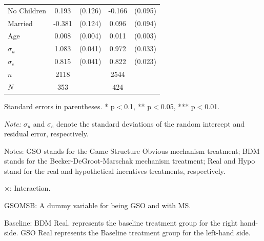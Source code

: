 \documentclass[12pt]{article}
\newcommand{\sym}[1]{\rlap{$^{#1}$}}
\begin{document}
\begin{table}[H]
{\begin{tabular}{l*{2}{cc}}
No Children &       0.193         &     (0.126)&      -0.166\sym{*}  &     (0.095)\\
Married     &      -0.381\sym{***}&     (0.124)&       0.096         &     (0.094)\\
Age         &       0.008\sym{**} &     (0.004)&       0.011\sym{***}&     (0.003)\\
$\sigma_u$     &       1.083\sym{***}&     (0.041)&       0.972\sym{***}&     (0.033)\\
$\sigma_e$     &       0.815\sym{***}&     (0.041)&       0.822\sym{***}&     (0.023)\\
\hline
\(n\)       &        2118         &            &        2544         &            \\
\(N\)       &        353        &            &        424         &            \\
\end{tabular}
}


\begin{tablenotes}
            \footnotesize
            \item Standard errors in parentheses. * p$<$0.1, ** p$<$0.05, *** p$<$0.01.
            \item \textit{Note:} $\sigma_u$ and $\sigma_e$ denote the standard deviations of the random intercept and residual error, respectively.
            \item Notes: GSO stands for the Game Structure Obvious mechanism treatment; BDM stands for the Becker-DeGroot-Marschak mechanism treatment; Real and Hypo stand for the real and hypothetical incentives treatments, respectively.
           \item $\times$: Interaction.
           \item GSOMSB: A dummy variable for being GSO and with MS.
           \item Baseline: BDM Real. represents the baseline treatment group for the right hand-side.
           GSO Real represents the Baseline treatment group for the left-hand side.
        \end{tablenotes}
\end{table}


\clearpage
\end{document}
